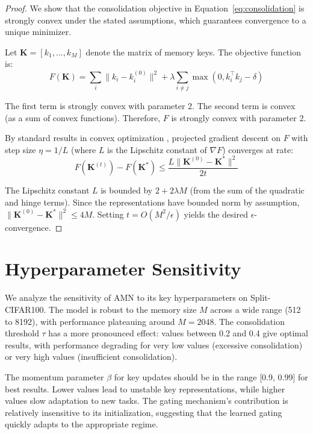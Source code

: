 \documentclass[11pt]{article}
\begin{document}
\begin{proof}
We show that the consolidation objective in Equation~\ref{eq:consolidation} is strongly convex under the stated assumptions, which guarantees convergence to a unique minimizer.

Let $\mathbf{K} = [k_1, \ldots, k_M]$ denote the matrix of memory keys. The objective function is:
\begin{equation}
    F(\mathbf{K}) = \sum_{i} \|k_i - k_i^{(0)}\|^2 + \lambda \sum_{i \neq j} \max(0, k_i^\top k_j - \delta)
\end{equation}

The first term is strongly convex with parameter 2. The second term is convex (as a sum of convex functions). Therefore, $F$ is strongly convex with parameter 2.

By standard results in convex optimization \citep{boyd2004convex}, projected gradient descent on $F$ with step size $\eta = 1/L$ (where $L$ is the Lipschitz constant of $\nabla F$) converges at rate:
\begin{equation}
    F(\mathbf{K}^{(t)}) - F(\mathbf{K}^*) \leq \frac{L \|\mathbf{K}^{(0)} - \mathbf{K}^*\|^2}{2t}
\end{equation}

The Lipschitz constant $L$ is bounded by $2 + 2\lambda M$ (from the sum of the quadratic and hinge terms). Since the representations have bounded norm by assumption, $\|\mathbf{K}^{(0)} - \mathbf{K}^*\|^2 \leq 4M$. Setting $t = O(M^2/\epsilon)$ yields the desired $\epsilon$-convergence.
\end{proof}

\section{Hyperparameter Sensitivity}
\label{app:hyperparams}

We analyze the sensitivity of AMN to its key hyperparameters on Split-CIFAR100. The model is robust to the memory size $M$ across a wide range (512 to 8192), with performance plateauing around $M = 2048$. The consolidation threshold $\tau$ has a more pronounced effect: values between 0.2 and 0.4 give optimal results, with performance degrading for very low values (excessive consolidation) or very high values (insufficient consolidation).

The momentum parameter $\beta$ for key updates should be in the range [0.9, 0.99] for best results. Lower values lead to unstable key representations, while higher values slow adaptation to new tasks. The gating mechanism's contribution is relatively insensitive to its initialization, suggesting that the learned gating quickly adapts to the appropriate regime.
\end{document}
